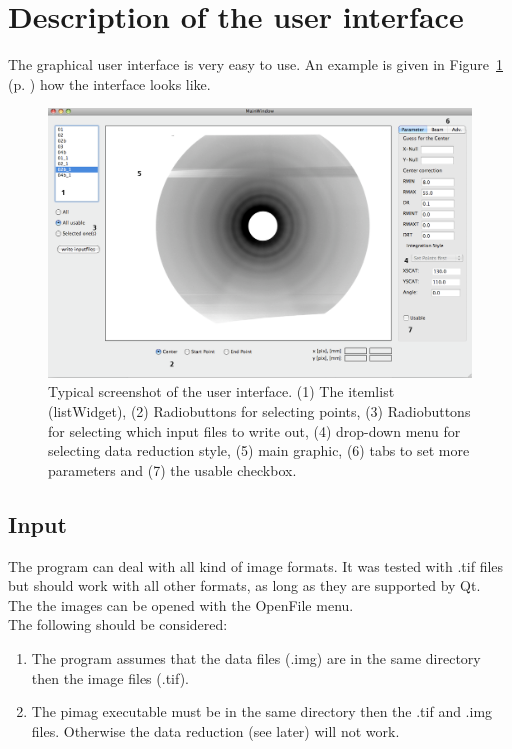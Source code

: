 \section{Description of the user interface}\label{interface} 
The graphical user interface is very easy to use. An example is given in Figure~\ref{ui} (p. \pageref{ui}) how the interface looks like. 

\begin{figure}
\includegraphics[width=20cm, angle=90]{ui.png}
\caption{Typical screenshot of the user interface. (1) The itemlist (listWidget), (2) Radiobuttons for selecting points, (3) Radiobuttons for selecting which input files to write out, (4) drop-down menu for selecting data reduction style, (5) main graphic, (6) tabs to set more parameters and (7) the usable checkbox. }
\label{ui} 
\end{figure} 

\subsection{Input}
The program can deal with all kind of image formats. It was tested with .tif files but should work with all other formats, as long as they are supported by Qt. \\
The the images can be opened with the OpenFile menu. \\
The following should be considered:
\begin{enumerate}
\item The program assumes that the data files (.img) are in the same directory then the image files (.tif). 
\item The pimag executable must be in the same directory then the .tif and .img files. Otherwise the data reduction (see later) will not work. 
\end{enumerate}

